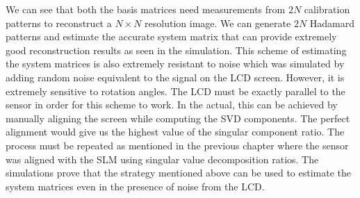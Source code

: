 We can see that both the basis matrices need measurements from $2N$ calibration patterns to reconstruct a $N \times N$ resolution image. We can generate $2N$ Hadamard patterns and estimate the accurate system matrix that can provide extremely good reconstruction results as seen in the simulation. This scheme of estimating the system matrices is also extremely resistant to noise which was simulated by adding random noise equivalent to the signal on the LCD screen. However, it is extremely sensitive to rotation angles. The LCD must be exactly parallel to the sensor in order for this scheme to work. In the actual, this can be achieved by manually aligning the screen while computing the SVD components. The perfect alignment would give us the highest value of the singular component ratio. The process must be repeated as mentioned in the previous chapter where the sensor was aligned with the SLM using singular value decomposition ratios. The simulations prove that the strategy mentioned above can be used to estimate the system matrices even in the presence of noise from the LCD.